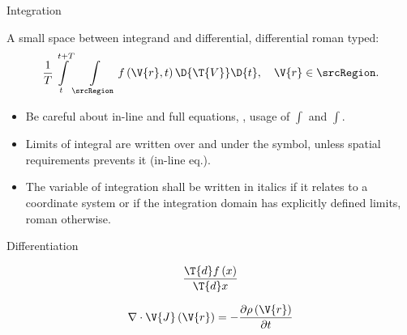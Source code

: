 \documentclass[xcolor=dvipsnames, aspectratio=169, handout, intlimits]{beamer}
\begin{document}
\begin{frame}{Integration}

\vspace{-0.5cm}
A small space between integrand and differential, differential roman typed:
\begin{equation*}
\frac{1}{T} \int\limits_{t}^{t+T} \int\limits_\srcRegion f \left(\V{r}, t \right) \D{\T{V}} \D{t}, \quad \V{r} \in \srcRegion.
\end{equation*}

\begin{itemize}
	\item Be careful about in-line and full equations, \ie{}, usage of $\int$ and $\displaystyle \int$.
	\item Limits of integral are written over and under the symbol, unless spatial requirements prevents it (in-line eq.).
	\item The variable of integration shall be written in italics if it relates to a coordinate system or if the integration domain has explicitly defined limits, roman otherwise.
\end{itemize}

\end{frame}

\begin{frame}{Differentiation}

\begin{equation*}
\frac{\T{d} f\left(x\right)}{\T{d}x}
\end{equation*}

\begin{equation*}
\nabla \cdot \V{J} \left(\V{r}\right) = - \frac{\partial \rho \left(\V{r}\right)}{\partial t}
\end{equation*}


\end{frame}
\end{document}
